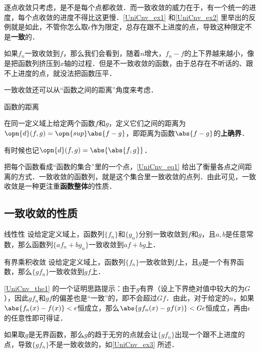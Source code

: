 逐点收敛只考虑，是不是每个点都收敛．而一致收敛的威力在于，有一个统一的进度，每个点收敛的进度不得比这更慢．\autoref{UniCnv_ex1} 和\autoref{UniCnv_ex2} 里举出的反例就是如此，不管你怎么取$\epsilon$作为限定，总存在跟不上进度的点，导致这种限定不是\textbf{一致}的．

如果$f_n$一致收敛到$f$，那么我们会看到，随着$n$增大，$f_n-f$的上下界越来越小，像是把函数列挤压到$x$轴的过程．但是不一致收敛的函数，由于总存在不听话的、跟不上进度的点，就没法把函数压平．

一致收敛还可以从“函数之间的距离”角度来考虑．

\begin{definition}{函数的距离}\label{UniCnv_def1}

在同一定义域上给定两个函数$f$和$g$，定义它们之间的距离为$\opn{d}(f, g)=\opn{sup}\abs{f-g}$，即距离为函数$\abs{f-g}$的\textbf{上确界}．

有时候也记$\opn{d}(f, g)=\abs{\abs{f, g}}$．

\end{definition}

把每个函数看成“函数的集合”里的一个点，\autoref{UniCnv_eq1} 给出了衡量各点之间距离的方式．一致收敛的函数列，就是这个集合里一致收敛的点列．由此可见，一致收敛是一种更注重\textbf{函数整体}的性质．


\subsection{一致收敛的性质}

\begin{theorem}{线性性}
设给定定义域上，函数列$\{f_n\}$和$\{g_n\}$分别一致收敛到$f$和$g$，且$a, b$是任意常数，那么函数列$\{af_n+bg_n\}$一致收敛到$af+bg$上．
\end{theorem}

\begin{theorem}{有界乘积收敛}\label{UniCnv_the1}
设给定定义域上，函数列$\{f_n\}$一致收敛到$f$上，且$g$是一个有界函数，那么$\{gf_n\}$一致收敛到$gf$上．
\end{theorem}

\autoref{UniCnv_the1} 的一个证明思路提示：由于$g$有界（设上下界绝对值中较大的为$G$），因此$gf_n$和$gf$的偏差也是“一致”的，即不会超过$Gf$．由此，对于给定的$n$，如果$\abs{f_n(x)-f(x)}<\epsilon$恒成立，那么$\abs{gf_n(x)-gf(x)}<G\epsilon$恒成立，再由$\epsilon$的任意性即可得证．

如果取$g$是无界函数，那么$g$的趋于无穷的点就会让$\{gf_n\}$出现一个跟不上进度的点，导致$\{gf_n\}$不是一致收敛的，如\autoref{UniCnv_ex3} 所述．

